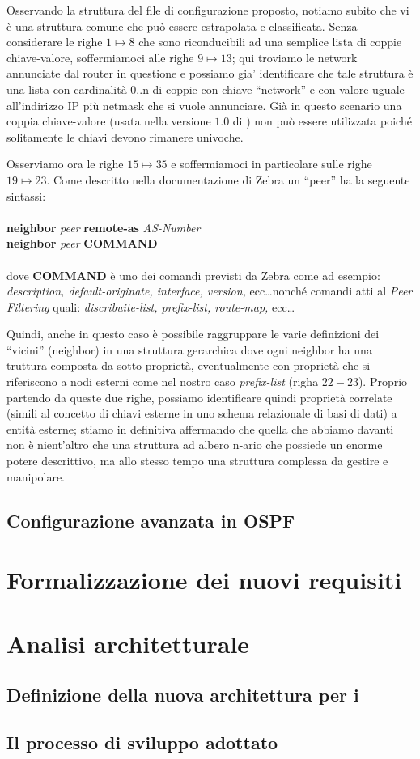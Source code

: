 Osservando la struttura del file di configurazione proposto, notiamo subito che vi è una struttura comune che può essere estrapolata e classificata. Senza considerare le righe $1\mapsto8$ che sono riconducibili ad una semplice lista di coppie chiave-valore, soffermiamoci alle righe $9\mapsto13$; qui troviamo le network annunciate dal router in questione e possiamo gia' identificare che tale struttura è una lista con cardinalità 0..n di coppie con chiave ``network'' e con valore uguale all'indirizzo IP più netmask che si vuole annunciare. Già in questo scenario una coppia chiave-valore (usata nella versione $1.0$ di \visualnetkit{}) non può essere utilizzata poiché solitamente le chiavi devono rimanere univoche.

Osserviamo ora le righe $15\mapsto35$ e soffermiamoci in particolare sulle righe $19\mapsto23$. Come descritto nella documentazione di Zebra\cite{ZEBRADOC} un ``peer'' ha la seguente sintassi:
\\
\\
\textbf{neighbor} \textit{peer} \textbf{remote-as} \textit{AS-Number}
\\
\textbf{neighbor} \textit{peer} \textbf{COMMAND}
\\
\\
dove \textbf{COMMAND} è uno dei comandi previsti da Zebra come ad esempio: \emph{description, default-originate, interface, version,} ecc\ldots nonché comandi atti al \emph{Peer Filtering} quali: \emph{discribuite-list, prefix-list, route-map,} ecc\ldots

Quindi, anche in questo caso è possibile raggruppare le varie definizioni dei ``vicini'' (neighbor) in una struttura gerarchica dove ogni neighbor ha una truttura composta da sotto proprietà, eventualmente con proprietà che si riferiscono a nodi esterni come nel nostro caso \emph{prefix-list} (righa $22-23$). Proprio partendo da queste due righe, possiamo identificare quindi proprietà correlate (simili al concetto di chiavi esterne in uno schema relazionale di basi di dati) a entità esterne; stiamo in definitiva affermando che quella che abbiamo davanti non è nient'altro che una struttura ad albero n-ario che possiede un enorme potere descrittivo, ma allo stesso tempo una struttura complessa da gestire e manipolare.


\subsection{Configurazione avanzata in OSPF}

\section{Formalizzazione dei nuovi requisiti}

\section{Analisi architetturale}

\subsection{Definizione della nuova architettura per i \plugin{}}

\subsection{Il processo di sviluppo adottato}

